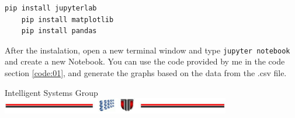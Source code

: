 \documentclass[a4paper,12pt]{report}
\begin{document}
\begin{Verbatim}[frame=single]
    pip install jupyterlab
    pip install matplotlib
    pip install pandas
\end{Verbatim}

After the instalation, open a new terminal window and type \texttt{jupyter notebook} and create a new Notebook. You can use the code provided by me in the code section \ref{code:01}, and generate the graphs based on the data from the .csv file.







\vspace{2cm}
\begin{center}
Intelligent Systems Group\\
\includegraphics[width=10cm]{fig/footer}
\end{center}
\end{document}
